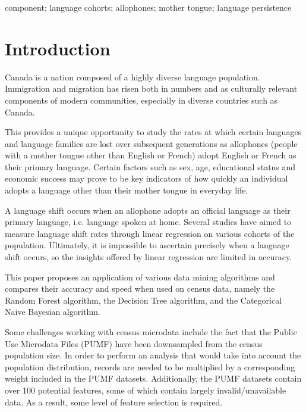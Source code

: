 \documentclass[10pt, conference, compsocconf]{IEEEtran}
\begin{document}
\begin{IEEEkeywords}
component; language cohorts; allophones; mother tongue; language persistence

\end{IEEEkeywords}


%
\IEEEpeerreviewmaketitle



\section{Introduction}
Canada is a nation composed of a highly diverse language population. Immigration and migration has risen both in numbers and as culturally relevant components of modern communities, especially in diverse countries such as Canada.

This provides a unique opportunity to study the rates at which certain languages and language families are lost over subsequent generations as allophones (people with a mother tongue other than English or French) adopt English or French as their primary language. Certain factors such as sex, age, educational status and economic success may prove to be key indicators of how quickly an individual adopts a language other than their mother tongue in everyday life.

A language shift occurs when an allophone adopts an official language as their primary language, i.e. language spoken at home. Several studies have aimed to measure language shift rates through linear regression on various cohorts of the population. Ultimately, it is impossible to ascertain precisely when a language shift occurs, so the insights offered by linear regression are limited in accuracy.

This paper proposes an application of various data mining algorithms and compares their accuracy and speed when used on census data, namely the Random Forest algorithm, the Decision Tree algorithm, and the Categorical Naive Bayesian algorithm.

Some challenges working with census microdata include the fact that the Public Use Microdata Files (PUMF) have been downsampled from the census population size. In order to perform an analysis that would take into account the population distribution, records are needed to be multiplied by a corresponding weight included in the PUMF datasets. Additionally, the PUMF datasets contain over 100 potential features, some of which contain largely invalid/unavailable data. As a result, some level of feature selection is required.
\end{document}

